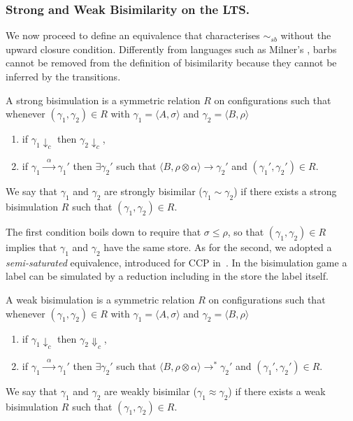 \documentclass[main.tex]{subfiles}
\begin{document}
\subsubsection{Strong and Weak Bisimilarity on the LTS.}
We now proceed to define an equivalence that
characterises  $\sim_{\mathit{sb}}$ without the upward closure condition. 
Differently from languages such as Milner's \CCS, 
barbs cannot be removed
from the definition of bisimilarity because they cannot be inferred by the transitions.


\begin{definition}\label{def:strong} A strong bisimulation is a symmetric relation $R$
on configurations such that whenever $(\gamma_1, \gamma_2) \in R$ with $\gamma_1 = \langle A, \sigma \rangle$ and $\gamma_2 = \langle B, \rho\rangle$
\begin{enumerate}
\item if $\gamma_1 \downarrow_c$ then $\gamma_2 \downarrow_c$,
\item if $\gamma_1 \xrightarrow{\; \; \alpha\;  \;} \gamma_1'$ then $\exists \gamma_2'$
such that $\langle B, \rho \otimes \alpha \rangle \longrightarrow \gamma_2'$ and $(\gamma_1', \gamma_2') \in R$.
\end{enumerate}
We say that $\gamma_1$ and $\gamma_2$ are strongly bisimilar ($\gamma_1 \sim \gamma_2$) if there exists a strong
bisimulation $R$ such that $(\gamma_1, \gamma_2) \in R$.
\end{definition}

The first condition boils down to require that $\sigma \leq \rho$, so that $(\gamma_1, \gamma_2) \in R$
 implies that $\gamma_1$ and $\gamma_2$ have the same store.
 As for the second, we adopted a \emph{semi-saturated} equivalence, introduced 
 for CCP in~\cite{pippo}. In the bisimulation game a label can  be simulated 
 by a reduction including in the store the label itself.

\begin{definition}\label{def:weak} A weak bisimulation is a symmetric
relation $R$ on configurations such that whenever $(\gamma_1, \gamma_2) \in R$ with $\gamma_1 = \langle A, \sigma \rangle$ and $\gamma_2 = \langle B, \rho\rangle$
\begin{enumerate}
\item if $\gamma_1 \downarrow_c$ then $\gamma_2 \Downarrow_c$,
\item if $\gamma_1 \xrightarrow{\; \; \alpha\;  \;} \gamma_1'$ then $\exists \gamma_2'$ such that $\langle B, \rho \otimes \alpha \rangle \longrightarrow^* \gamma_2'$ and $(\gamma_1', \gamma_2') \in R$.
\end{enumerate}
We say that $\gamma_1$ and $\gamma_2$ are weakly bisimilar ($\gamma_1 \approx \gamma_2$) if there exists a weak bisimulation $R$ such that $(\gamma_1, \gamma_2) \in R$.
\end{definition}
\end{document}
